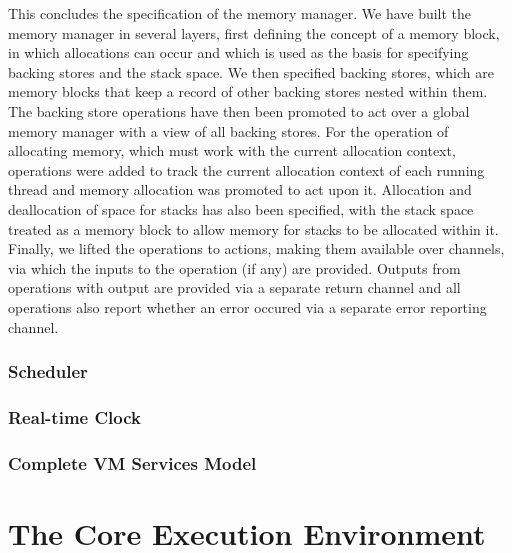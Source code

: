\documentclass[a4paper,10pt]{report}
\begin{document}


This concludes the specification of the memory manager.
We have built the memory manager in several layers, first defining the
concept of a memory block, in which allocations can occur and which is
used as the basis for specifying backing stores and the stack space.
We then specified backing stores, which are memory blocks that keep a
record of other backing stores nested within them.
The backing store operations have then been promoted to act over a
global memory manager with a view of all backing stores.
For the operation of allocating memory, which must work with the
current allocation context, operations were added to track the current
allocation context of each running thread and memory allocation was
promoted to act upon it.
Allocation and deallocation of space for stacks has also been
specified, with the stack space treated as a memory block to allow
memory for stacks to be allocated within it.
Finally, we lifted the operations to \Circus{} actions, making them
available over channels, via which the inputs to the operation (if
any) are provided.
Outputs from operations with output are provided via a separate return
channel and all operations also report whether an error occured via a
separate error reporting channel.

\subsection{Scheduler}
\label{scheduler-model-section}



\subsection{Real-time Clock}
\label{realtime-clock-model-section}


\subsection{Complete VM Services Model}
\label{scjvm-services-section}


\chapter{The Core Execution Environment}
\label{cee-chapter}
\end{document}
